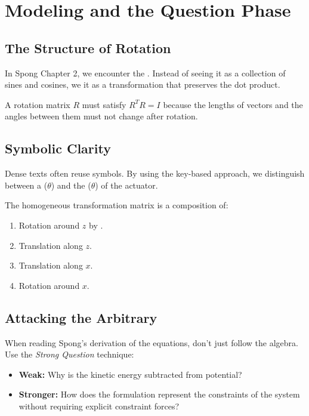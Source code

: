 \chapter{Modeling and the Question Phase}


\section{The Structure of Rotation}

In Spong Chapter 2, we encounter the . Instead of seeing it as a collection of sines and cosines, we  it as a transformation that preserves the dot product.

\begin{intuitionbox}
    A rotation matrix \(R\) must satisfy \(R^T R = I\) because the lengths of vectors and the angles between them must not change after rotation.
\end{intuitionbox}

\section{Symbolic Clarity}

Dense texts often reuse symbols. By using the  key-based approach, we distinguish between a  (\(\theta\)) and the  (\(\theta\)) of the actuator.

\begin{examplebox}
    The homogeneous transformation matrix is a composition of:
    \begin{enumerate}
        \item Rotation around \(z\) by .
        \item Translation along \(z\).
        \item Translation along \(x\).
        \item Rotation around \(x\).
    \end{enumerate}
\end{examplebox}

\section{Attacking the Arbitrary}

When reading Spong's derivation of the  equations, don't just follow the algebra. Use the \textit{Strong Question} technique:
\begin{itemize}
    \item \textbf{Weak:} Why is the kinetic energy subtracted from potential?
    \item \textbf{Stronger:} How does the  formulation represent the constraints of the system without requiring explicit constraint forces?
\end{itemize}
